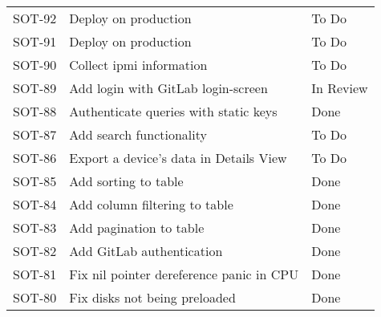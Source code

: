 \documentclass[dutch]{article}
\begin{document}
\begin{longtable}{@{}lp{6cm}l@{}}
    SOT-92             & Deploy on production                                                                                                      & To Do           \\
    SOT-91             & Deploy on production                                                                                                      & To Do           \\
    SOT-90             & Collect ipmi information                                                                                                  & To Do           \\
    SOT-89             & Add login with GitLab login-screen                                                                                        & In Review       \\
    SOT-88             & Authenticate queries with static keys                                                                                     & Done            \\
    SOT-87             & Add search functionality                                                                                                  & To Do           \\
    SOT-86             & Export a device's data in Details View                                                                                    & To Do           \\
    SOT-85             & Add sorting to table                                                                                                      & Done            \\
    SOT-84             & Add column filtering to table                                                                                             & Done            \\
    SOT-83             & Add pagination to table                                                                                                   & Done            \\
    SOT-82             & Add GitLab authentication                                                                                                 & Done            \\
    SOT-81             & Fix nil pointer dereference panic in CPU                                                                                  & Done            \\
    SOT-80             & Fix disks not being preloaded                                                                                             & Done            \\

\end{longtable}
\end{document}
